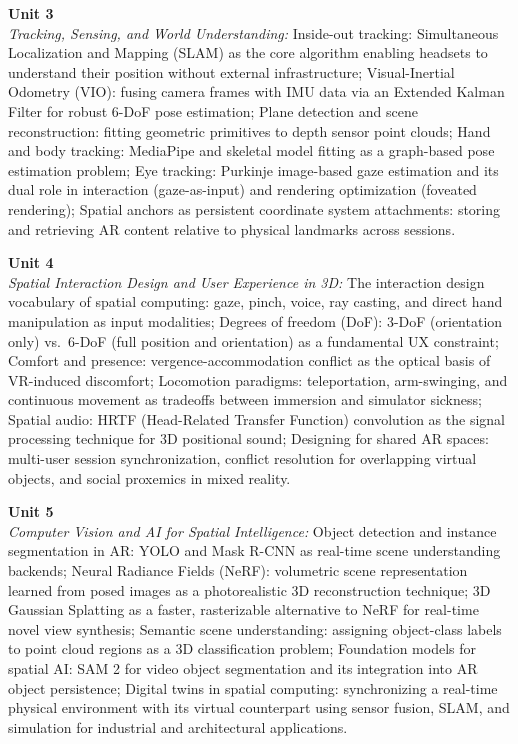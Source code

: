 \vspace{0.3cm}

\noindent\textbf{Unit 3} \\
\textit{Tracking, Sensing, and World Understanding:} Inside-out tracking: Simultaneous Localization and Mapping (SLAM) as the core algorithm enabling headsets to understand their position without external infrastructure; Visual-Inertial Odometry (VIO): fusing camera frames with IMU data via an Extended Kalman Filter for robust 6-DoF pose estimation; Plane detection and scene reconstruction: fitting geometric primitives to depth sensor point clouds; Hand and body tracking: MediaPipe and skeletal model fitting as a graph-based pose estimation problem; Eye tracking: Purkinje image-based gaze estimation and its dual role in interaction (gaze-as-input) and rendering optimization (foveated rendering); Spatial anchors as persistent coordinate system attachments: storing and retrieving AR content relative to physical landmarks across sessions.

\vspace{0.3cm}

\noindent\textbf{Unit 4} \\
\textit{Spatial Interaction Design and User Experience in 3D:} The interaction design vocabulary of spatial computing: gaze, pinch, voice, ray casting, and direct hand manipulation as input modalities; Degrees of freedom (DoF): 3-DoF (orientation only) vs.\ 6-DoF (full position and orientation) as a fundamental UX constraint; Comfort and presence: vergence-accommodation conflict as the optical basis of VR-induced discomfort; Locomotion paradigms: teleportation, arm-swinging, and continuous movement as tradeoffs between immersion and simulator sickness; Spatial audio: HRTF (Head-Related Transfer Function) convolution as the signal processing technique for 3D positional sound; Designing for shared AR spaces: multi-user session synchronization, conflict resolution for overlapping virtual objects, and social proxemics in mixed reality.

\vspace{0.3cm}

\noindent\textbf{Unit 5} \\
\textit{Computer Vision and AI for Spatial Intelligence:} Object detection and instance segmentation in AR: YOLO and Mask R-CNN as real-time scene understanding backends; Neural Radiance Fields (NeRF): volumetric scene representation learned from posed images as a photorealistic 3D reconstruction technique; 3D Gaussian Splatting as a faster, rasterizable alternative to NeRF for real-time novel view synthesis; Semantic scene understanding: assigning object-class labels to point cloud regions as a 3D classification problem; Foundation models for spatial AI: SAM 2 for video object segmentation and its integration into AR object persistence; Digital twins in spatial computing: synchronizing a real-time physical environment with its virtual counterpart using sensor fusion, SLAM, and simulation for industrial and architectural applications.

\newpage
{}